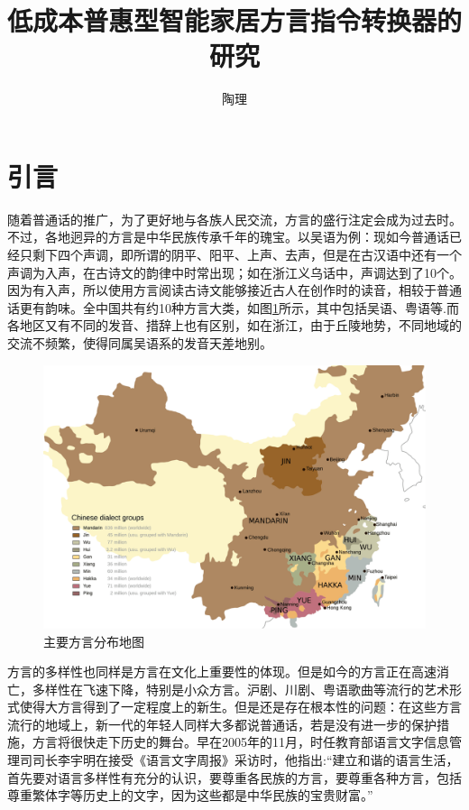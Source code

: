 \documentclass[lang=cn,cite=super]{elegantpaper}
\title{低成本普惠型智能家居方言指令转换器的研究}
\author{陶理}
\date{}
\begin{document}
\maketitle
\begin{abstract}
\end{abstract}
\newpage
\begin{center}
    \tableofcontents
\end{center}
\newpage
\setcounter{section}{-1}
\section{引言}
随着普通话的推广，为了更好地与各族人民交流，方言的盛行注定会成为过去时。不过，各地迥异的方言是中华民族传承千年的瑰宝。以吴语为例：现如今普通话已经只剩下四个声调，即所谓的阴平、阳平、上声、去声，但是在古汉语中还有一个声调为入声，在古诗文的韵律中时常出现；如在浙江义乌话中，声调达到了10个。因为有入声，所以使用方言阅读古诗文能够接近古人在创作时的读音，相较于普通话更有韵味。全中国共有约10种方言大类，如图\ref{fig:chinese-lanaguages-map}所示，其中包括吴语、粤语等.而各地区又有不同的发音、措辞上也有区别，如在浙江，由于丘陵地势，不同地域的交流不频繁，使得同属吴语系的发音天差地别。
\begin{figure}[h]
    \caption{\label{fig:chinese-lanaguages-map}主要方言分布地图}
    \centering
    \includegraphics[scale=0.3]{chinese-lanaguages-map.png}
\end{figure}

方言的多样性也同样是方言在文化上重要性的体现。但是如今的方言正在高速消亡，多样性在飞速下降，特别是小众方言。沪剧、川剧、粤语歌曲等流行的艺术形式使得大方言得到了一定程度上的新生。但是还是存在根本性的问题：在这些方言流行的地域上，新一代的年轻人同样大多都说普通话，若是没有进一步的保护措施，方言将很快走下历史的舞台。早在2005年的11月，时任教育部语言文字信息管理司司长李宇明在接受《语言文字周报》采访时，他指出:“建立和谐的语言生活，首先要对语言多样性有充分的认识，要尊重各民族的方言，要尊重各种方言，包括尊重繁体字等历史上的文字，因为这些都是中华民族的宝贵财富。”
\end{document}
